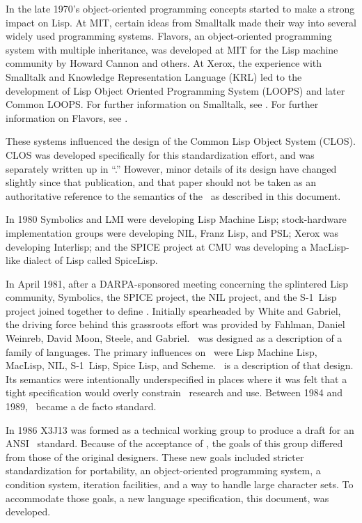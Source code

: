 In the late 1970's object-oriented programming concepts started to
make a strong impact on Lisp. 
At MIT, certain ideas from Smalltalk made their way into several
widely used programming systems.
Flavors, an object-oriented programming system with multiple inheritance, 
was developed at MIT for the Lisp machine community by Howard Cannon and others.
At Xerox, the experience with Smalltalk and 
Knowledge Representation Language (KRL) led to the development of 
Lisp Object Oriented Programming System (LOOPS) and later Common LOOPS.
For further information on Smalltalk, see {\SmalltalkBook}.
For further information on Flavors, see {\FlavorsPaper}.

These systems influenced the design of the Common Lisp Object System (CLOS).
CLOS was developed specifically for this standardization effort,
and was separately written up in ``\CLOSPaper.''  However, minor details
of its design have changed slightly since that publication, and that paper 
should not be taken as an authoritative reference to the semantics of the
\CLOS\ as described in this document.

In 1980 Symbolics and LMI were developing Lisp Machine Lisp; stock-hardware
implementation groups were developing NIL, Franz Lisp, and PSL; Xerox
was developing Interlisp; and the SPICE project at CMU was developing
a MacLisp-like dialect of Lisp called SpiceLisp.
 
In April 1981, after a DARPA-sponsored meeting concerning the
splintered Lisp community, Symbolics, the SPICE project, the NIL
project, and the \hbox{S-1}~Lisp project joined together to define
\clisp.  Initially spearheaded by White and Gabriel, the
driving force behind this grassroots effort was provided by Fahlman,
Daniel Weinreb, David Moon, Steele,  and Gabriel.
\clisp\ was designed as a description of a family of languages.  The
primary influences on \clisp\ were Lisp Machine Lisp, MacLisp, NIL,
\hbox{S-1}~Lisp, Spice Lisp, and Scheme.
\CLtL\ is a description of that design.  Its
semantics were intentionally underspecified in places where it was
felt that a tight specification would overly constrain \clisp\
research and use.  Between 1984 and 1989, \clisp\ became a de facto
standard. 

In 1986 X3J13 was formed as a technical working group to
produce a draft for an ANSI \clisp\ standard. Because of the
acceptance of \clisp, the goals of this group differed from those of
the original designers. These new goals included stricter
standardization for portability, an object-oriented programming
system, a condition system, iteration facilities, and a way to handle
large character sets.  To accommodate those
goals, a new language specification, this
document, was developed.
 
\endsubSection%

